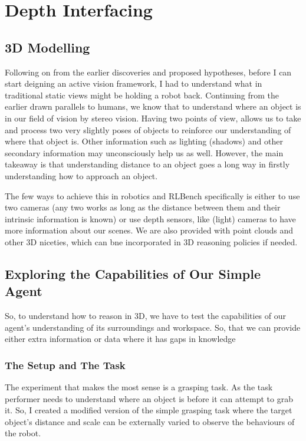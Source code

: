 \section{Depth Interfacing}


\subsection{3D Modelling} 
Following on from the earlier discoveries and proposed hypotheses, before I can start deigning an active vision framework, I had to understand what in traditional static views might be holding a robot back. Continuing from the earlier drawn parallels to humans, we know that to understand where an object is in our field of vision by stereo vision. Having two points of view, allows us to take and process two very slightly poses of objects to reinforce our understanding of where that object is. Other information such as lighting (shadows) and other secondary information may unconsciously help us as well. However, the main takeaway is that understanding distance to an object goes a long way in firstly understanding how to approach an object.

The few ways to achieve this in robotics and RLBench specifically is either to use two cameras (any two works as long as the distance between them and their intrinsic information is known) or use depth sensors, like (light) cameras to have more information about our scenes. We are also provided with point clouds and other 3D niceties, which can bne incorporated in 3D reasoning policies if needed.

\subsection{Exploring the Capabilities of Our Simple Agent}
So, to understand how to reason in 3D, we have to test the capabilities of our agent's understanding of its surroundings and workspace. So, that we can provide either extra information or data where it has gaps in knowledge

\subsubsection{The Setup and The Task}
The experiment that makes the most sense is a grasping task. As the task performer needs to understand where an object is before it can attempt to grab it. So, I created a modified version of the simple grasping task where the target object's distance and scale can be externally varied to observe the behaviours of the robot.

